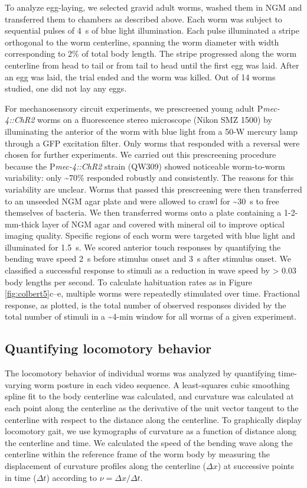 To analyze egg-laying, we selected gravid adult worms, washed them in NGM and transferred them to chambers as described above. Each worm was subject to sequential pulses of 4~s of blue light illumination. Each pulse illuminated a stripe orthogonal to the worm centerline, spanning the worm diameter with width corresponding to 2\% of total body length. The stripe progressed along the worm centerline from head to tail or from tail to head until the first egg was laid. After an egg was laid, the trial ended and the worm was killed. Out of 14 worms studied, one did not lay any eggs.

For mechanosensory circuit experiments, we prescreened young adult P\textit{mec-4::ChR2} worms on a fluorescence stereo microscope (Nikon SMZ 1500) by illuminating the anterior of the worm with blue light from a 50-W mercury lamp through a GFP excitation filter. Only worms that responded with a reversal were chosen for further experiments. We carried out this prescreening procedure because the P\textit{mec-4::ChR2} strain (QW309) showed noticeable worm-to-worm variability: only \textasciitilde70\% responded robustly and consistently. The reasons for this variability are unclear. Worms that passed this prescreening were then transferred to an unseeded NGM agar plate and were allowed to crawl for \textasciitilde30~s to free themselves of bacteria. We then transferred worms onto a plate containing a 1-2-mm-thick layer of NGM agar and covered with mineral oil to improve optical imaging quality. Specific regions of each worm were targeted with blue light and illuminated for 1.5~s. We scored anterior touch responses by quantifying the bending wave speed 2~s before stimulus onset and 3~s after stimulus onset. We classified a successful response to stimuli as a reduction in wave speed by > 0.03 body lengths per second. To calculate habituation rates as in Figure \ref{fig:colbert5}c–e, multiple worms were repeatedly stimulated over time. Fractional response, as plotted, is the total number of observed responses divided by the total number of stimuli in a \textasciitilde4-min window for all worms of a given experiment.

\subsection{Quantifying locomotory behavior}
The locomotory behavior of individual worms was analyzed by quantifying time-varying worm posture in each video sequence. A least-squares cubic smoothing spline fit to the body centerline was calculated, and curvature was calculated at each point along the centerline as the derivative of the unit vector tangent to the centerline with respect to the distance along the centerline. To graphically display locomotory gait, we use kymographs of curvature as a function of distance along the centerline and time. We calculated the speed of the bending wave along the centerline within the reference frame of the worm body by measuring the displacement of curvature profiles along the centerline ($\Delta x$) at successive points in time ($\Delta t$) according to $\nu = \Delta x / \Delta t$.

